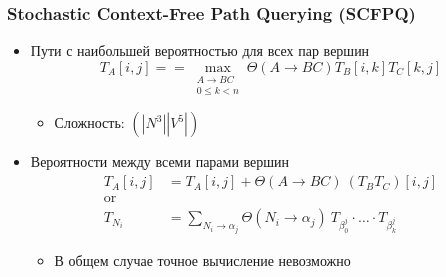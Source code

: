 \documentclass[xcolor=table]{beamer}
\begin{document}
\begin{frame}[fragile]
  \transwipe[direction=90]
  \frametitle{Stochastic Context-Free Path Querying (SCFPQ)}
  \begin{itemize}
  \item Пути с наибольшей вероятностью для всех пар вершин
      $$T_A[i,j] == \max_{\substack{A \to BC \\ 0 \leq k < n}} \Theta(A \to BC) T_B[i,k] T_C[k,j]$$
  \begin{itemize}
      \item Сложность: $(|N^3||V^5|)$
  \end{itemize}
  \item Вероятности между всеми парами вершин
      \begin{align*}
        T_A[i,j] &= T_A[i,j] + \Theta(A \to BC) \ (T_BT_C)[i, j] \\
        \text{or} \\
        T_{N_i} &= \sum_{N_i \to \alpha_j} \Theta(N_i \to \alpha_j) \ T_{\beta^j_0}\cdot \ldots \cdot T_{\beta^j_k}
    \end{align*}
  \begin{itemize}
      \item В общем случае точное вычисление невозможно
  \end{itemize}
    
\end{itemize}
\end{frame}
\end{document}
